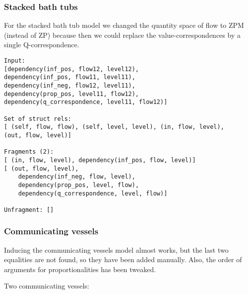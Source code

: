 \documentclass{article} %
\begin{document}
\subsubsection{Stacked bath tubs}

For the stacked bath tub model we changed the quantity space of flow to ZPM
(instead of ZP) because then we could replace the value-correspondences by a
single Q-correspondence.

\begin{verbatim}
Input: 
[dependency(inf_pos, flow12, level12), 
dependency(inf_pos, flow11, level11), 
dependency(inf_neg, flow12, level11), 
dependency(prop_pos, level11, flow12), 
dependency(q_correspondence, level11, flow12)]

Set of struct rels: 
[ (self, flow, flow), (self, level, level), (in, flow, level), 
(out, flow, level)]

Fragments (2): 
[ (in, flow, level), dependency(inf_pos, flow, level)]
[ (out, flow, level), 
	dependency(inf_neg, flow, level), 
	dependency(prop_pos, level, flow), 
	dependency(q_correspondence, level, flow)]

Unfragment: []
\end{verbatim}

\subsubsection{Communicating vessels} 
Inducing the communicating vessels model almost works, but the last two
equalities are not found, so they have been added manually. Also, the order of
arguments for proportionalities has been tweaked. 

Two communicating vessels:
\end{document}
